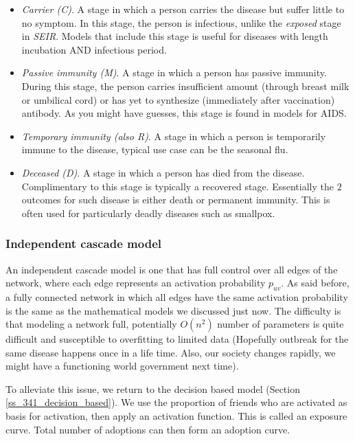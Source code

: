 \begin{itemize}
    \item \textit{Carrier (C)}. A stage in which a person carries the disease but suffer little to no symptom. In this stage, the person is infectious, unlike the \textit{exposed} stage in \textit{SEIR}. Models that include this stage is useful for diseases with length incubation AND infectious period. 
    
    \item \textit{Passive immunity (M)}. A stage in which a person has passive immunity. During this stage, the person carries insufficient amount (through breast milk or umbilical cord) or has yet to synthesize (immediately after vaccination) antibody. As you might have guesses, this stage is found in models for AIDS. 
    
    \item \textit{Temporary immunity (also R)}. A stage in which a person is temporarily immune to the disease, typical use case can be the seasonal flu.
    
    \item \textit{Deceased (D)}. A stage in which a person has died from the disease. Complimentary to this stage is typically a recovered stage. Essentially the $2$ outcomes for such disease is either death or permanent immunity. This is often used for particularly deadly diseases such as smallpox. 
\end{itemize}{}

\subsubsection{Independent cascade model}

An independent cascade model is one that has full control over all edges of the network, where each edge represents an activation probability $p_{uv}$. As said before, a fully connected network in which all edges have the same activation probability is the same as the mathematical models we discussed just now. The difficulty is that modeling a network full, potentially $O(n^2)$ number of parameters is quite difficult and susceptible to overfitting to limited data (Hopefully outbreak for the same disease happens once in a life time. Also, our society changes rapidly, we might have a functioning world government next time).

To alleviate this issue, we return to the decision based model (Section \ref{ss_341_decision_based}). We use the proportion of friends who are activated as basis for activation, then apply an activation function. This is called an exposure curve. Total number of adoptions can then form an adoption curve.

